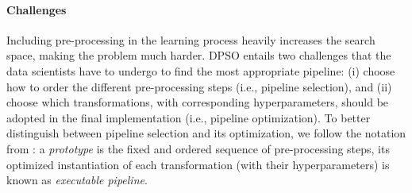 \paragraph{Challenges} Including pre-processing in the learning process heavily increases the search space, making the problem much harder.
DPSO entails two challenges that the data scientists have to undergo to find the most appropriate pipeline: (i) choose how to order the different pre-processing steps  (i.e., pipeline selection), and (ii) choose which transformations, with corresponding hyperparameters, should be adopted in the final implementation  (i.e., pipeline optimization).
To better distinguish between pipeline selection and its optimization, we follow the notation from \cite{Quemy20InfSystems}: a \textit{prototype} is the fixed and ordered sequence of pre-processing steps, its optimized instantiation of each transformation (with their hyperparameters) is known as \textit{executable pipeline}.




